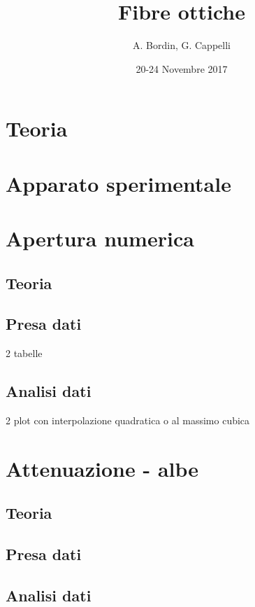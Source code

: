 \documentclass[a4paper]{article}
\author{A. Bordin, G. Cappelli}
\title{Fibre ottiche}
\date{20-24 Novembre 2017}
\begin{document}
	\maketitle
	
	\begin{abstract}
		 
	\end{abstract}
	
\section{Teoria}

\section{Apparato sperimentale}

\section{Apertura numerica}

\subsection{Teoria}

\subsection{Presa dati}

2 tabelle

\subsection{Analisi dati}

2 plot con interpolazione quadratica o al massimo cubica

\section{Attenuazione - albe}

\subsection{Teoria}

\subsection{Presa dati}

\subsection{Analisi dati}
\end{document}
